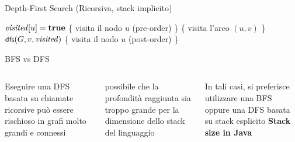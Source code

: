 \begin{frame}{Depth-First Search (Ricorsiva, stack implicito)}
	
\begin{Procedure}
\caption[A]{\dfsproc(\Graph $G$, \Node\ $u$, $\BOOLEAN[\,]\ \mmark$)}
  
$\mmark[u] = \TRUE$\;
\{ \alert{visita il nodo $u$ (pre-order)} \}\;
{
  \If{\NOT $\mmark[v]$}
  {
    \{ \alert{visita l'arco $(u,v)$} \}\;
    $\textsf{{\small dfs}}(G, v, \mathit{visited})$\; 
  }
}
\{ \alert{visita il nodo $u$ (post-order)} \}\;
\end{Procedure}


\end{frame}

\begin{frame}{BFS vs DFS}

\begin{columns}[T]
\BIL
\item Eseguire una DFS basata su chiamate ricorsive può essere rischioso in
grafi molto grandi e connessi
\item \EE possibile che la profondità raggiunta sia troppo grande per la
dimensione dello stack del linguaggio
\item In tali casi, si preferisce utilizzare una BFS oppure una DFS
basata su stack esplicito
\EIL
{}
\textbf{Stack size in Java}

\smallskip
{}
\end{columns}
    
\end{frame}

